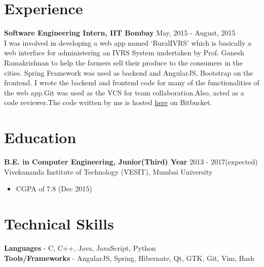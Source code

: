 \documentclass[12pt,margin, centered]{res}
\begin{document}
\begin{resume}



\section{Experience}
\vspace{10mm}
\textbf{Software Engineering Intern, IIT Bombay} \hfill May, 2015 - August, 2015\\
I was involved in developing a web app named ‘RuralIVRS’ which is basically a web interface for administering an IVRS System undertaken by Prof. Ganesh Ramakrishnan to help the farmers sell their produce to the consumers in the cities. Spring Framework was used as backend and AngularJS, Bootstrap on the frontend. I wrote the backend and frontend code for many of the functionalities of the web app.Git was used as the VCS for team collaboration.Also, acted as a code reviewer.The code written by me is hosted \href{https://bitbucket.org/pranavg189/ruralict}{here} on Bitbucket.



\section{Education}
\vspace{10mm}
\textbf{B.E. in Computer Engineering, Junior(Third) Year} \hfill 2013 - 2017(expected) \\
Vivekananda Institute of Technology (VESIT), Mumbai University
\begin{itemize}
 \item CGPA of 7.8 (Dec 2015)
\end{itemize}

\section{Technical \hspace{2mm} Skills}
\vspace{10mm}
\textbf{Languages} - C, C++, Java, JavaScript, Python \\
\textbf{Tools/Frameworks} -  AngularJS, Spring, Hibernate, Qt, GTK, Git, Vim, Bash


\end{resume}
\end{document}
